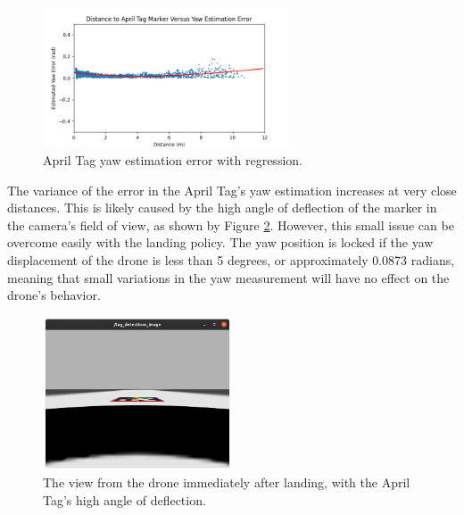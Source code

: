\begin{figure}[h!]
    \centering
    \includegraphics[width=0.65\textwidth]{images/apriltag_yaw_estimation_error.png}
    \caption{April Tag yaw estimation error with regression.}
    \label{fig:apriltag_yaw_estimation_error}
\end{figure}

The variance of the error in the April Tag's yaw estimation increases at very close distances. This is likely caused by the high angle of deflection of the marker in the camera's field of view, as shown by Figure \ref{fig:apriltag_landed_view}. However, this small issue can be overcome easily with the landing policy. The yaw position is locked if the yaw displacement of the drone is less than 5 degrees, or approximately 0.0873 radians, meaning that small variations in the yaw measurement will have no effect on the drone's behavior.

\begin{figure}[h]
    \centering
    \includegraphics[width=0.5\textwidth]{images/landed_view.png}
    \caption{The view from the drone immediately after landing, with the April Tag's high angle of deflection.}
    \label{fig:apriltag_landed_view}
\end{figure}


